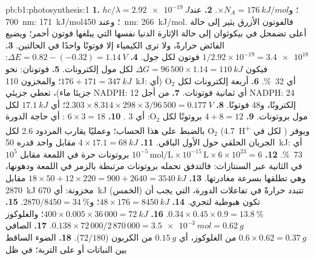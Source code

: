 \begin{solution}{pb:b1:photosynthesis:1}
\textbf{1.} $hc/\lambda = \qty{2.92e-19}{J}$؛ و$\times N_A = \qty{176}{kJ/mol}$.
\textbf{2.} عند \qty{700}{nm}: \qty{171}{kJ/mol}؛ وعند \qty{450}{nm}:
\qty{266}{kJ/mol}. فالفوتون الأزرق يثير  إلى حالة أعلى تضمحل في
بيكوثوان إلى حالة الإثارة الدنيا نفسها التي يبلغها فوتون أحمر؛ ويضيع
الفائض حرارةً، ولا ترى الكيمياء إلا فوتونًا واحدًا في الحالتين.
\textbf{3.} $1/2.92\times 10^{-19} = \num{3.4e18}$ فوتون لكل جول.
\textbf{4.} $\Delta E = 0.82 - (-0.32) = \qty{1.14}{V}$: فيكون
$\Delta G =
96\,500\times 1.14 = \qty{110}{kJ}$ لكل مول إلكترونات.
\textbf{5.} فوتونان: نحو $176 + 171 = \qty{347}{kJ}$؛ والمخزون
\qty{110}{kJ}: أي \qty{32}{\%}.
\textbf{6.} أربعة إلكترونات لكل $\mathrm{O_2}$ (أي جزيئا ماء)، تعطي
جزيئي NADPH: أي ثمانية فوتونات.
\textbf{7.} من أجل 12 NADPH: 24 إلكترونًا، و48 فوتونًا.
\textbf{8.} $2.303\times 8.314\times 298\times 3/96\,500 = \qty{0.177}{V}$؛
أي $\qty{17.1}{kJ}$ لكل مول بروتونات.
\textbf{9.} $4 + 8 = 12$ بروتونًا لكل $\mathrm{O_2}$: أي 3 .
\textbf{10.} $6\times 3 = 18$ : أي حاجة الدورة بالضبط على هذا
الحساب؛ وعمليًا يقارب المردود 2.6 لكل $\mathrm{O_2}$
(\qty{4.7}{H^+} لكل  في ) ويوفر الجريان الحلقي حول
 الأول الباقي.
\textbf{11.} $4\times 17.1 = \qty{68}{kJ}$ مقابل  واحد قدره
\qty{50}{kJ}: أي \qty{73}{\%}.
\textbf{12.} $10^{-5}\,\mathrm{mol/L}\times 10^{-15}\,\mathrm{L}\times
6\times 10^{23} = 6$ بروتونات حرة في اللمعة مقابل $10^5$ في الثانية
عبر السنتازات: فالتدفق تحمله بروتونات مرتبطة بالزمر  في
 اللمعة ودهونها، وهي تطلقها بسرعة مغادرتها.
\textbf{13.} $18\times 50 + 12\times 220 = 900 + 2640 = \qty{3540}{kJ}$
مقابل \qty{2870}{kJ} مخزونة: أي \qty{670}{kJ} (الخمس) تتبدد حرارةً في
تفاعلات الدورة، التي يجب أن تكون هبوطية لتجري.
\textbf{14.} $48\times 176 = \qty{8450}{kJ}$؛ و$2870/8450 = \qty{34}{\%}$.
\textbf{15.} $0.34\times 0.45\times 0.9 = \qty{13.8}{\%}$.
\textbf{16.} $400\times 0.005\times 36\,000 = \qty{72}{kJ}$؛ والغلوكوز
$0.138\times 72\,000/2\,870\,000 = \qty{3.5e-3}{mol} = \qty{0.62}{g}$.
\textbf{17.} الصافي $0.6\times 0.62 = \qty{0.37}{g}$ من الغلوكوز، أي
$\qty{0.15}{g}$ من الكربون ($72/180$).
\textbf{18.} الضوء الساقط بين النباتات أو على التربة؛  في ظل

\end{solution}

